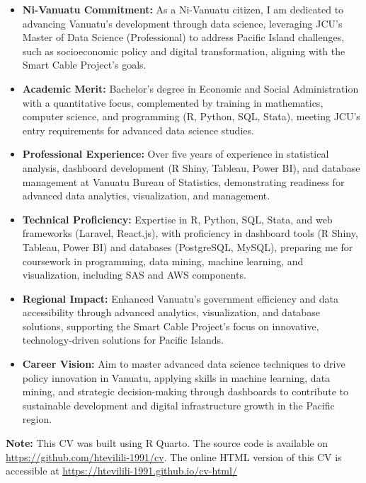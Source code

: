 \documentclass[
  letterpaper,
  DIV=11,
  numbers=noendperiod]{scrartcl}
\providecommand{\tightlist}{%
  \setlength{\itemsep}{0pt}\setlength{\parskip}{0pt}}
\begin{document}
\begin{itemize}
\tightlist
\item
  \textbf{Ni-Vanuatu Commitment:} As a Ni-Vanuatu citizen, I am
  dedicated to advancing Vanuatu's development through data science,
  leveraging JCU's Master of Data Science (Professional) to address
  Pacific Island challenges, such as socioeconomic policy and digital
  transformation, aligning with the Smart Cable Project's goals.
\item
  \textbf{Academic Merit:} Bachelor's degree in Economic and Social
  Administration with a quantitative focus, complemented by training in
  mathematics, computer science, and programming (R, Python, SQL,
  Stata), meeting JCU's entry requirements for advanced data science
  studies.
\item
  \textbf{Professional Experience:} Over five years of experience in
  statistical analysis, dashboard development (R Shiny, Tableau, Power
  BI), and database management at Vanuatu Bureau of Statistics,
  demonstrating readiness for advanced data analytics, visualization,
  and management.
\item
  \textbf{Technical Proficiency:} Expertise in R, Python, SQL, Stata,
  and web frameworks (Laravel, React.js), with proficiency in dashboard
  tools (R Shiny, Tableau, Power BI) and databases (PostgreSQL, MySQL),
  preparing me for coursework in programming, data mining, machine
  learning, and visualization, including SAS and AWS components.
\item
  \textbf{Regional Impact:} Enhanced Vanuatu's government efficiency and
  data accessibility through advanced analytics, visualization, and
  database solutions, supporting the Smart Cable Project's focus on
  innovative, technology-driven solutions for Pacific Islands.
\item
  \textbf{Career Vision:} Aim to master advanced data science techniques
  to drive policy innovation in Vanuatu, applying skills in machine
  learning, data mining, and strategic decision-making through
  dashboards to contribute to sustainable development and digital
  infrastructure growth in the Pacific region.
\end{itemize}

\textbf{Note:} This CV was built using R Quarto. The source code is
available on \url{https://github.com/htevilili-1991/cv}. The online HTML
version of this CV is accessible at
\url{https://htevilili-1991.github.io/cv-html/}
\end{document}
